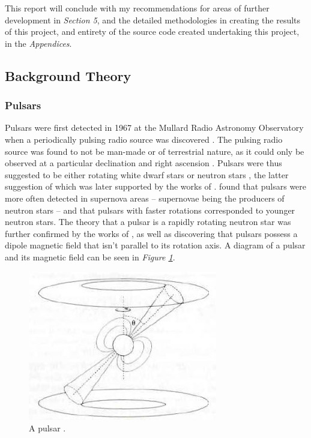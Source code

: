 \documentclass{article}
\begin{document}
This report will conclude with my recommendations for areas of further development in \emph{Section 5}, and the detailed methodologies in creating the results of this project, and entirety of the source code created undertaking this project, in the \emph{Appendices}.

\pagebreak
\subsection{Background Theory}

\subsubsection{Pulsars}

Pulsars were first detected in 1967 at the Mullard Radio Astronomy Observatory when a periodically pulsing radio source was discovered \autocite{hewish:pulsar}. The pulsing radio source was found to not be man-made or of terrestrial nature, as it could only be observed at a particular declination and right ascension \autocite{hewish:pulsar}. Pulsars were thus suggested to be either rotating white dwarf stars or neutron stars \autocite{hewish:pulsar,gold:pulsar}, the latter suggestion of which was later supported by the works of \textcite{gold:pulsar}. \textcite{gold:pulsar} found that pulsars were more often detected in supernova areas -- supernovae being the producers of neutron stars -- and that pulsars with faster rotations corresponded to younger neutron stars. The theory that a pulsar is a rapidly rotating neutron star was further confirmed by the works of \textcite{ostriker:pulsar}, as well as discovering that pulsars possess a dipole magnetic field that isn't parallel to its rotation axis. A diagram of a pulsar and its magnetic field can be seen in \emph{Figure \ref{fig:pulsar1}}.

\begin{figure}[h!]
    \centering
    \includegraphics{pulsar.jpg}
    \caption{A pulsar \autocite{maoz}.}
    \label{fig:pulsar1}
\end{figure}
\end{document}
